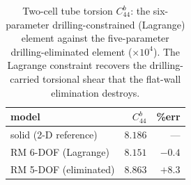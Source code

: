 \begin{table}[htpb]
\centering
\caption{Two-cell tube torsion $C^{b}_{44}$: the six-parameter drilling-constrained (Lagrange) element against the five-parameter drilling-eliminated element ($\times10^{4}$). The Lagrange constraint recovers the drilling-carried torsional shear that the flat-wall elimination destroys.}
\label{tab:twodrill}
\begin{tabular}{l rr}
\hline
model & $C^{b}_{44}$ & \%err \\
\hline
solid (2-D reference) & $8.186$ & --- \\
RM 6-DOF (Lagrange) & $8.151$ & $-0.4$ \\
RM 5-DOF (eliminated) & $8.863$ & $+8.3$ \\
\hline
\end{tabular}
\end{table}